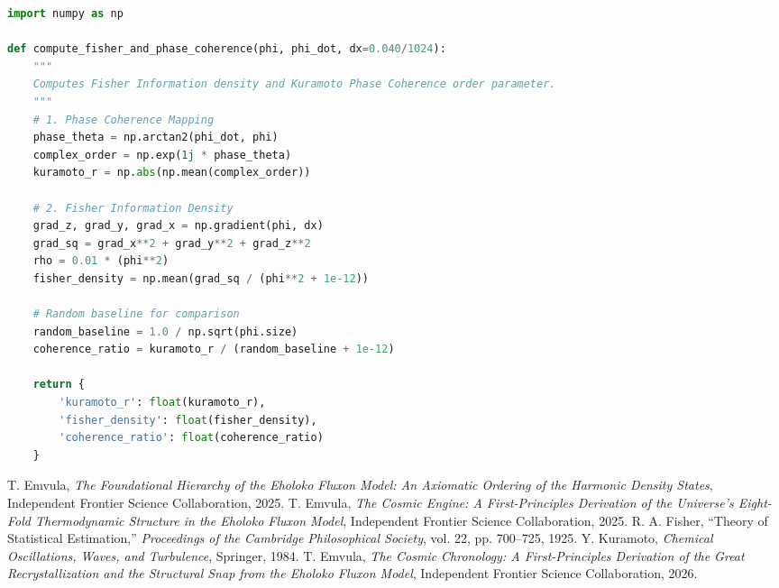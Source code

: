 \documentclass[11pt, twoside]{article}
\begin{document}
\begin{lstlisting}[language=Python, caption={Subspace Phase Scanner and Fisher Information Metric.}]
import numpy as np

def compute_fisher_and_phase_coherence(phi, phi_dot, dx=0.040/1024):
    """
    Computes Fisher Information density and Kuramoto Phase Coherence order parameter.
    """
    # 1. Phase Coherence Mapping
    phase_theta = np.arctan2(phi_dot, phi)
    complex_order = np.exp(1j * phase_theta)
    kuramoto_r = np.abs(np.mean(complex_order))
    
    # 2. Fisher Information Density
    grad_z, grad_y, grad_x = np.gradient(phi, dx)
    grad_sq = grad_x**2 + grad_y**2 + grad_z**2
    rho = 0.01 * (phi**2)
    fisher_density = np.mean(grad_sq / (phi**2 + 1e-12))
    
    # Random baseline for comparison
    random_baseline = 1.0 / np.sqrt(phi.size)
    coherence_ratio = kuramoto_r / (random_baseline + 1e-12)
    
    return {
        'kuramoto_r': float(kuramoto_r),
        'fisher_density': float(fisher_density),
        'coherence_ratio': float(coherence_ratio)
    }
\end{lstlisting}


\begin{thebibliography}{9}
 T. Emvula, \textit{The Foundational Hierarchy of the Eholoko Fluxon Model: An Axiomatic Ordering of the Harmonic Density States}, Independent Frontier Science Collaboration, 2025.
 T. Emvula, \textit{The Cosmic Engine: A First-Principles Derivation of the Universe's Eight-Fold Thermodynamic Structure in the Eholoko Fluxon Model}, Independent Frontier Science Collaboration, 2025.
 R. A. Fisher, ``Theory of Statistical Estimation,'' \textit{Proceedings of the Cambridge Philosophical Society}, vol. 22, pp. 700--725, 1925.
 Y. Kuramoto, \textit{Chemical Oscillations, Waves, and Turbulence}, Springer, 1984.
 T. Emvula, \textit{The Cosmic Chronology: A First-Principles Derivation of the Great Recrystallization and the Structural Snap from the Eholoko Fluxon Model}, Independent Frontier Science Collaboration, 2026.
\end{thebibliography}
\end{document}
